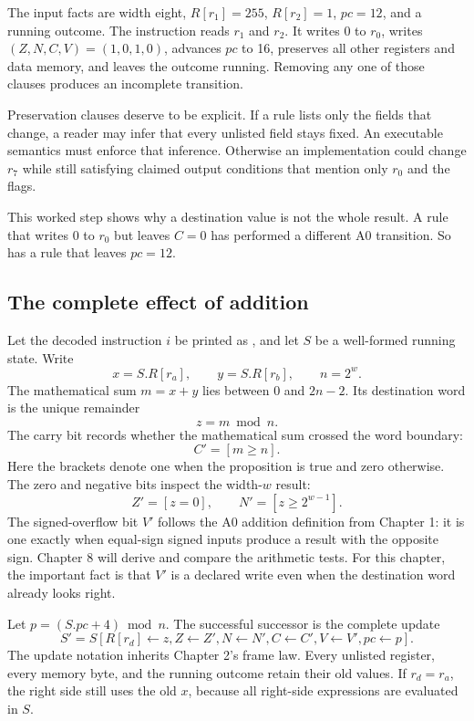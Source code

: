 \begin{example}[title={One complete A0 addition}]
The input facts are width eight, \(R[r_1]=255\), \(R[r_2]=1\), \(pc=12\), and
a running outcome. The instruction reads \(r_1\) and \(r_2\). It writes 0 to
\(r_0\), writes \((Z,N,C,V)=(1,0,1,0)\), advances \(pc\) to 16, preserves all
other registers and data memory, and leaves the outcome running. Removing any
one of those clauses produces an incomplete transition.
\end{example}

Preservation clauses deserve to be explicit. If a rule lists only the fields
that change, a reader may infer that every unlisted field stays fixed. An
executable semantics must enforce that inference. Otherwise an implementation
could change \(r_7\) while still satisfying claimed output conditions that
mention only \(r_0\) and the flags.

This worked step shows why a destination value is not the whole result. A rule
that writes 0 to \(r_0\) but leaves \(C=0\) has performed a different A0
transition. So has a rule that leaves \(pc=12\).

\subsection{The complete effect of addition}

Let the decoded instruction \(i\) be printed as , and let
\(S\) be a well-formed running state. Write
\[
 x=S.R[r_a],\qquad y=S.R[r_b],\qquad n=2^w.
\]
The mathematical sum \(m=x+y\) lies between 0 and \(2n-2\). Its destination
word is the unique remainder
\[
 z=m\bmod n.
\]
The carry bit records whether the mathematical sum crossed the word boundary:
\[
 C'=[m\geq n].
\]
Here the brackets denote one when the proposition is true and zero otherwise.
The zero and negative bits inspect the width-\(w\) result:
\[
 Z'=[z=0],\qquad N'=[z\geq 2^{w-1}].
\]
The signed-overflow bit \(V'\) follows the A0 addition definition from Chapter
1: it is one exactly when equal-sign signed inputs produce a result with the
opposite sign. Chapter 8 will derive and compare the arithmetic tests. For
this chapter, the important fact is that \(V'\) is a declared write even when
the destination word already looks right.

Let \(p=(S.pc+4)\bmod n\). The successful successor is the complete update
\[
 S'=S[R[r_d]\leftarrow z,
       Z\leftarrow Z',N\leftarrow N',C\leftarrow C',V\leftarrow V',
       pc\leftarrow p].
\]
The update notation inherits Chapter 2's frame law. Every unlisted register,
every memory byte, and the running outcome retain their old values. If
\(r_d=r_a\), the right side still uses the old \(x\), because all right-side
expressions are evaluated in \(S\).


